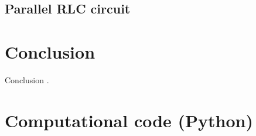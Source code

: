 \documentclass[12pt,twoside]{extarticle}
\begin{document}
\subsection{Parallel RLC circuit}
\begin{table}[!ht]
    \centering
        \caption{Parameters of the analytical evolution of the current through an inductor for the simple problem of a RLC circuit in parallel configuration, with values for the components of $R= 0.1\,\Omega$, $L= 5.1\,\mu H$, and $C= 9.98\,\mu F$; as well as the initial conditions $V_0= 5.14 V$ and $I_0= 1.1 A$. This is an overdamped circuit, so the function is of the form $I(t)=Ae^{\alpha}+Be^{\beta}$. The error generated by the parameters found using the Newton-Ramphson method for data fitting by non linear least squares of both datasets, obtained by experimental measurements and computer simulation, are also included. In both cases the resulting error is minimal.}
    \label{tab:parallel}
\end{table}



\section{Conclusion}
\noindent Conclusion .\cite{bobrow1983analisis}



\newpage\thispagestyle{empty}
\printbibliography{}

\newpage\thispagestyle{empty}
\appendix
\section{Computational code (Python)}
\end{document}
